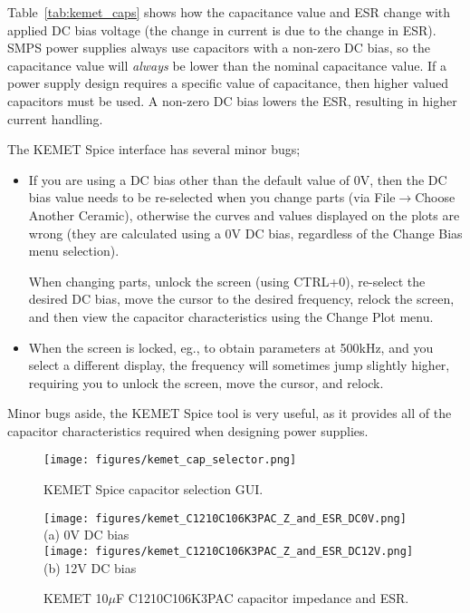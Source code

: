\documentclass[10pt,twoside]{article}
\begin{document}
Table~\ref{tab:kemet_caps} shows how the capacitance value and ESR change
with applied DC bias voltage (the change in current is due to the change in ESR).
SMPS power supplies always use capacitors with a non-zero DC bias, so
the capacitance value will {\em always} be lower than the nominal
capacitance value. If a power supply design requires a specific value
of capacitance, then higher valued capacitors must be used. A non-zero
DC bias lowers the ESR, resulting in higher current handling.

The KEMET Spice interface has several minor bugs;
%
\begin{itemize}
\item If you are using a DC bias other than the default value of
0V, then the DC bias value needs to be re-selected when you change
parts (via File$\rightarrow$Choose Another Ceramic), otherwise
the curves and values displayed on the plots are wrong
(they are calculated using a 0V DC bias, regardless of the
Change Bias menu selection).

When changing parts, unlock the screen (using CTRL+0), re-select the
desired DC bias, move the cursor to the desired frequency, 
relock the screen, and then view the capacitor characteristics
using the Change Plot menu.
%
\item When the screen is locked, eg., to obtain parameters at 500kHz,
and you select a different display, the frequency will sometimes jump slightly
higher, requiring you to unlock the screen, move the cursor, and relock.
\end{itemize}
%
Minor bugs aside, the KEMET Spice tool is very useful, as it provides
all of the capacitor characteristics required when designing power supplies.

%
\begin{figure}[p]
  \begin{center}
    \texttt{[image: figures/kemet\_cap\_selector.png]}\\
  \end{center}
  \caption{KEMET Spice capacitor selection GUI.}
  \label{fig:kemet_cap_selector}
\end{figure}

\begin{figure}[p]
  \begin{center}
    \texttt{[image: figures/kemet\_C1210C106K3PAC\_Z\_and\_ESR\_DC0V.png]}\\
    (a) 0V DC bias\\
    $\quad$\\
    \texttt{[image: figures/kemet\_C1210C106K3PAC\_Z\_and\_ESR\_DC12V.png]}\\
    (b) 12V DC bias\\
  \end{center}
  \caption{KEMET 10$\mu$F C1210C106K3PAC capacitor impedance and ESR.}
  \label{fig:kemet_Z_and_ESR}
\end{figure}
\end{document}
